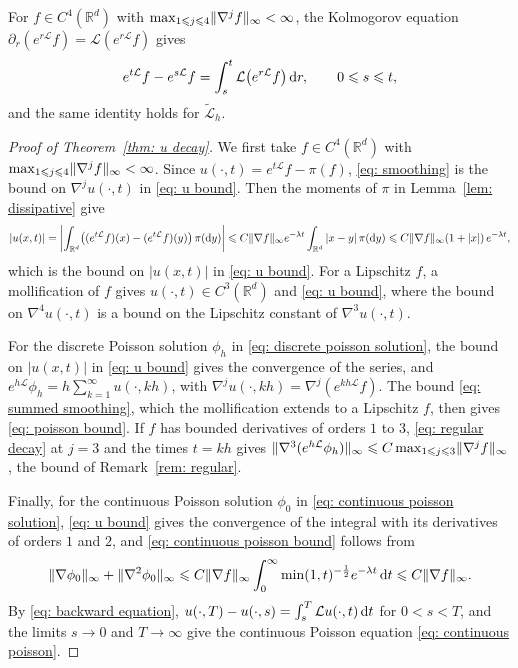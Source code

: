 For $f \in C^4(\mathbb R^d)$ with $\max_{1 \leqslant j \leqslant 4} \lVert \nabla^j f \rVert_\infty < \infty$, the Kolmogorov equation $\partial_r ( e^{r\mathcal L} f ) = \mathcal L ( e^{r\mathcal L} f )$ gives
\begin{equation}
    e^{t\mathcal L} f - e^{s\mathcal L} f = \int_s^t \mathcal L \bigl( e^{r\mathcal L} f \bigr)\, \mathrm{d} r , \qquad 0 \leqslant s \leqslant t ,
    \label{eq: backward equation}
\end{equation}
and the same identity holds for $\tilde{\mathcal L}_h$.

\begin{proof}[Proof of Theorem~\ref{thm: u decay}]
    We first take $f \in C^4(\mathbb R^d)$ with $\max_{1 \leqslant j \leqslant 4} \lVert \nabla^j f \rVert_\infty < \infty$. Since $u(\cdot,t) = e^{t\mathcal L} f - \pi(f)$, \eqref{eq: smoothing} is the bound on $\nabla^j u(\cdot,t)$ in \eqref{eq: u bound}. Then the moments of $\pi$ in Lemma~\ref{lem: dissipative} give
    \begin{equation}
        |u(x,t)| = \biggl| \int_{\mathbb R^d} \bigl( (e^{t\mathcal L} f)(x) - (e^{t\mathcal L} f)(y) \bigr)\, \pi(\mathrm{d} y) \biggr| \leqslant C \lVert \nabla f \rVert_\infty e^{-\lambda t} \int_{\mathbb R^d} |x - y|\, \pi(\mathrm{d} y) \leqslant C \lVert \nabla f \rVert_\infty (1 + |x|)\, e^{-\lambda t} ,
        \label{eq: relaxation}
    \end{equation}
    which is the bound on $|u(x,t)|$ in \eqref{eq: u bound}. For a Lipschitz $f$, a mollification of $f$ gives $u(\cdot,t) \in C^3(\mathbb R^d)$ and \eqref{eq: u bound}, where the bound on $\nabla^4 u(\cdot,t)$ is a bound on the Lipschitz constant of $\nabla^3 u(\cdot,t)$.

    For the discrete Poisson solution $\phi_h$ in \eqref{eq: discrete poisson solution}, the bound on $|u(x,t)|$ in \eqref{eq: u bound} gives the convergence of the series, and $e^{h\mathcal L} \phi_h = h \sum_{k=1}^{\infty} u(\cdot, kh)$, with $\nabla^j u(\cdot, kh) = \nabla^j ( e^{kh\mathcal L} f )$. The bound \eqref{eq: summed smoothing}, which the mollification extends to a Lipschitz $f$, then gives \eqref{eq: poisson bound}. If $f$ has bounded derivatives of orders $1$ to $3$, \eqref{eq: regular decay} at $j = 3$ and the times $t = kh$ gives $\lVert \nabla^3 ( e^{h\mathcal L} \phi_h ) \rVert_\infty \leqslant C \max_{1 \leqslant j \leqslant 3} \lVert \nabla^j f \rVert_\infty$, the bound of Remark~\ref{rem: regular}.

    Finally, for the continuous Poisson solution $\phi_0$ in \eqref{eq: continuous poisson solution}, \eqref{eq: u bound} gives the convergence of the integral with its derivatives of orders $1$ and $2$, and \eqref{eq: continuous poisson bound} follows from
    \begin{equation*}
        \lVert \nabla \phi_0 \rVert_\infty + \lVert \nabla^2 \phi_0 \rVert_\infty \leqslant C \lVert \nabla f \rVert_\infty \int_0^\infty \min(1,t)^{-\frac12} e^{-\lambda t}\, \mathrm{d} t \leqslant C \lVert \nabla f \rVert_\infty .
    \end{equation*}
    By \eqref{eq: backward equation}, $u(\cdot,T) - u(\cdot,s) = \int_s^T \mathcal L u(\cdot,t)\, \mathrm{d} t$ for $0 < s < T$, and the limits $s \to 0$ and $T \to \infty$ give the continuous Poisson equation \eqref{eq: continuous poisson}.
\end{proof}

